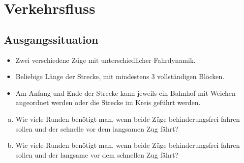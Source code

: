 \documentclass[
    nexus,      %
    10pt,        %
    oneside,
    draft=true,
    green,
]{tubsbook} %
\begin{document}
  \newpage
  \section{Verkehrsfluss}
    \subsection*{Ausgangssituation}
    \begin{itemize}
      \item Zwei verschiedene Züge mit unterschiedlicher Fahrdynamik.
      \item Beliebige Länge der Strecke, mit mindestens 3 vollständigen Blöcken.
      \item Am Anfang und Ende der Strecke kann jeweils ein Bahnhof mit Weichen angeordnet werden oder die Strecke im Kreis geführt werden.
    \end{itemize}
    \aufgabe
    \begin{enumerate}[a)]
      \item Wie viele Runden benötigt man, wenn beide Züge behinderungsfrei fahren sollen und der schnelle vor dem langsamen Zug fährt?
      \item Wie viele Runden benötigt man, wenn beide Züge behinderungsfrei fahren sollen und der langsame vor dem schnellen Zug fährt?
    \end{enumerate}
\end{document}
